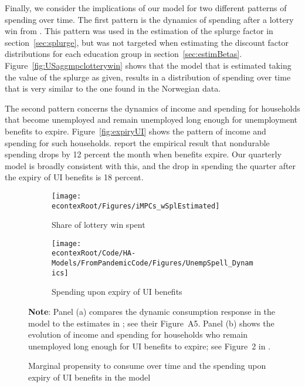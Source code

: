 \documentclass[\econtexRoot/HAFiscal]{subfiles}
\begin{document}
Finally, we consider the implications of our model for two different patterns of spending over time.
The first pattern is the dynamics of spending after a lottery win from \citeauthor{fagereng_mpc_2021}.
This pattern was used in the estimation of the splurge factor in section~\ref{sec:splurge}, but was not targeted when estimating the discount factor distributions for each education group in section~\ref{sec:estimBetas}.
Figure~\ref{fig:USaggmpclotterywin} shows that the model that is estimated taking the value of the splurge as given, results in a distribution of spending over time that is very similar to the one found in the Norwegian data.

\hypertarget{ganong-noel}{}

The second pattern concerns the dynamics of income and spending for households that become unemployed and remain unemployed long enough for unemployment benefits to expire.
Figure~\ref{fig:expiryUI} shows the pattern of income and spending for such households.
\citet{ganongConsumer2019} report the empirical result that nondurable spending drops by 12 percent the month when benefits expire.
Our quarterly model is broadly consistent with this, and the drop in spending the quarter after the expiry of UI benefits is 18 percent.

\begin{figure}[htb]
    \centering
    \begin{subfigure}[b]{.48\linewidth}
        \centering
        \texttt{[image: \\econtexRoot/Figures/iMPCs\_wSplEstimated]}
        \caption{Share of lottery win spent}
        \notinsubfile{\label{fig:USaggmpclotterywin}}
    \end{subfigure}%
    \begin{subfigure}[b]{.48\linewidth}
        \centering
        \texttt{[image: \\econtexRoot/Code/HA-Models/FromPandemicCode/Figures/UnempSpell\_Dynamics]}
        \caption{Spending upon expiry of UI benefits}
        \notinsubfile{\label{fig:expiryUI}}
    \end{subfigure}
    \caption{Marginal propensity to consume over time and the spending upon expiry of UI benefits in the model}
    \notinsubfile{\label{fig:untargetedMoments}}
\begin{minipage}{16cm}
\small \vspace{.15cm} \textbf{Note}: Panel (a) compares the dynamic consumption response in the model to the estimates in {\citet{fagereng_mpc_2021}}; see their Figure~A5.
Panel (b) shows the evolution of income and spending for households who remain unemployed long enough for UI benefits to expire; see Figure~2 in {\citet{ganongConsumer2019}}.\normalsize
\end{minipage}
  \end{figure}
  
\end{document}
